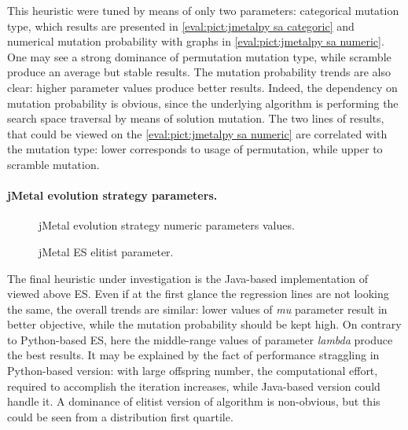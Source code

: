This heuristic were tuned by means of only two parameters: categorical mutation type, which results are presented in \cref{eval:pict:jmetalpy sa categoric} and numerical mutation probability with graphs in \cref{eval:pict:jmetalpy sa numeric}. One may see a strong dominance of permutation mutation type, while scramble produce an average but stable results. The mutation probability trends are also clear: higher parameter values produce better results. Indeed, the dependency on mutation probability is obvious, since the underlying algorithm is performing the search space traversal by means of solution mutation. The two lines of results, that could be viewed on the \cref{eval:pict:jmetalpy sa numeric} are correlated with the mutation type: lower corresponds to usage of permutation, while upper to scramble mutation.


\paragraph{jMetal evolution strategy parameters.}
\begin{figure}[h]
	\centering
	\vspace{-10pt}
	
	\caption{jMetal evolution strategy numeric parameters values.}
	\vspace{-15pt}
	\label{eval:pict:jmetal es numeric}
\end{figure}

\begin{wrapfigure}{R}{0.5\textwidth}
	\centering
	\vspace{-20pt}
	
	\label{eval:pict:jmetal es categoric}
	\caption{jMetal ES elitist parameter.}
	\vspace{-30pt}
\end{wrapfigure}

The final heuristic under investigation is the Java-based implementation of viewed above ES. Even if at the first glance the regression lines are not looking the same, the overall trends are similar: lower values of \emph{mu} parameter result in better objective, while the mutation probability should be kept high. On contrary to Python-based ES, here the middle-range values of parameter \emph{lambda} produce the best results. It may be explained by the fact of performance straggling in Python-based version: with large offspring number, the computational effort, required to accomplish the iteration increases, while Java-based version could handle it. A dominance of elitist version of algorithm is non-obvious, but this could be seen from a distribution first quartile.

